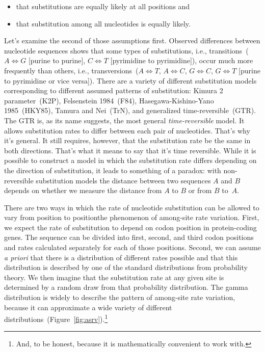\documentclass[12pt]{article}
\begin{document}
\begin{itemize}

\item that substitutions are equally likely at all positions and

\item that substitution among all nucleotides is equally likely.

\end{itemize}

Let's examine the second of those assumptions first. Observed
differences between nucleotide sequences shows that some types of
substitutions, i.e., transitions~($A \iff G$ [purine to purine], $C
\iff T$ [pyrimidine to pyrimidine]), occur much more frequently than
others, i.e., transversions~($A \iff T$, $A \iff C$, $G \iff C$, $G
\iff T$ [purine to pyrimidine or vice versa]). There are a variety of
different substitution models corresponding to different assumed
patterns of substitution: Kimura 2 parameter~(K2P), Felsenstein
1984~(F84), Hasegawa-Kishino-Yano 1985~(HKY85), Tamura and Nei~(TrN),
and generalized time-reversible~(GTR). The GTR is, as its name
suggests, the most general {\it time-reversible\/} model. It allows
substitution rates to differ between each pair of nucleotides. That's
why it's general. It still requires, however, that the substitution
rate be the same in both directions. That's what it means to say that
it's time reversible. While it is possible to construct a model in
which the substitution rate differs depending on the direction of
substitution, it leads to something of a paradox: with non-reversible
substitution models the distance between two sequences $A$ and $B$
depends on whether we measure the distance from $A$ to $B$ or from $B$
to~$A$.

There are two ways in which the rate of nucleotide substitution can be
allowed to vary from position to position{\dash}the phenomenon of
among-site rate variation. First, we expect the rate of substitution
to depend on codon position in protein-coding genes. The sequence can
be divided into first, second, and third codon positions and rates
calculated separately for each of those positions. Second, we can
assume {\it a priori\/} that there is a distribution of different
rates possible and that this distribution is described by one of the
standard distributions from probability theory. We then imagine that
the substitution rate at any given site is determined by a random draw
from that probability distribution. The gamma distribution is widely
to describe the pattern of among-site rate variation, because it can
approximate a wide variety of different
distributions~(Figure~\ref{fig:asrv}).\footnote{And, to be honest,
  because it is mathematically convenient to work
  with.}
\end{document}
